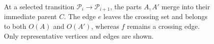 \begin{figure}[tbp]
  \endgroup
  \caption{At a selected transition $\mathcal P_i\to\mathcal P_{i+1}$,
    the parts $A,A'$ merge into their immediate parent $C$.
    The edge $e$ leaves the crossing set and belongs to both $O(A)$ and
    $O(A')$, whereas $f$ remains a crossing edge.
    Only representative vertices and edges are shown.}
  \label{fig:hierarchy}
\end{figure}
